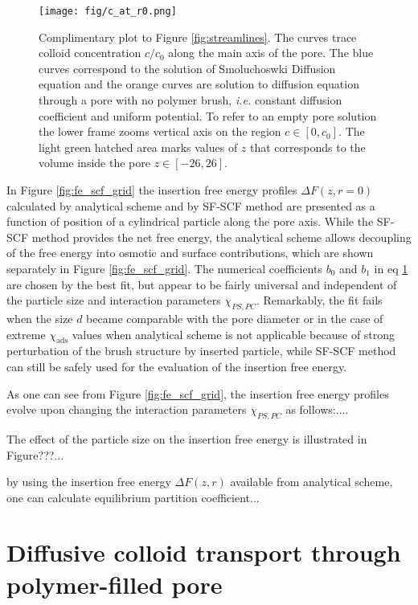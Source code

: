 \documentclass[12pt, a4paper]{article}
\begin{document}
\begin{figure}
    \centering
    \texttt{[image: fig/c\_at\_r0.png]}
    \caption{
    Complimentary plot to Figure \ref{fig:streamlines}. 
    The curves trace colloid concentration $c/c_0$ along the main axis of the pore. 
    The blue curves correspond to the solution of Smoluchoswki Diffusion equation and the orange curves are solution to diffusion equation through a pore with no polymer brush, \textit{i.e.} constant diffusion coefficient and uniform potential.
    To refer to an empty pore solution the lower frame zooms vertical axis on the region $c \in [0, c_0]$.
    The light green hatched area marks values of $z$ that corresponds to the volume inside the pore $z\in [-26, 26]$.
    }
    \label{fig:c_at_r0}
\end{figure}


In Figure \ref{fig:fe_scf_grid} the insertion free energy profiles $\Delta F(z,r=0)$ calculated by analytical scheme and by SF-SCF method are presented as a function of position of a cylindrical particle along the pore axis.
While the SF-SCF method provides the net free energy, the analytical scheme allows decoupling of the free energy into osmotic and surface contributions, which are shown separately in Figure \ref{fig:fe_scf_grid}.
The numerical coefficients $b_0$ and $b_1$ in eq \ref{} are chosen by the best fit, but appear to be fairly universal and independent of the particle size and interaction parameters $\chi_{PS,PC}$.
Remarkably, the fit fails when the size $d$ became comparable with the pore diameter or in the case of extreme $\chi_{\textrm{ads}}$ values when analytical scheme is not applicable because of strong perturbation 
of the brush structure by inserted particle, while SF-SCF method can still be safely used
for the evaluation of the insertion free energy.

As one can see from Figure \ref{fig:fe_scf_grid}, the insertion free energy profiles evolve upon changing the interaction parameters $\chi_{PS,PC}$ as follows:....

The effect of the particle size on the insertion free energy is illustrated in Figure???...

by using the insertion free energy $\Delta F(z,r)$ available from analytical scheme, one can calculate equilibrium partition coefficient...


\section{Diffusive colloid transport through polymer-filled pore}
\end{document}
